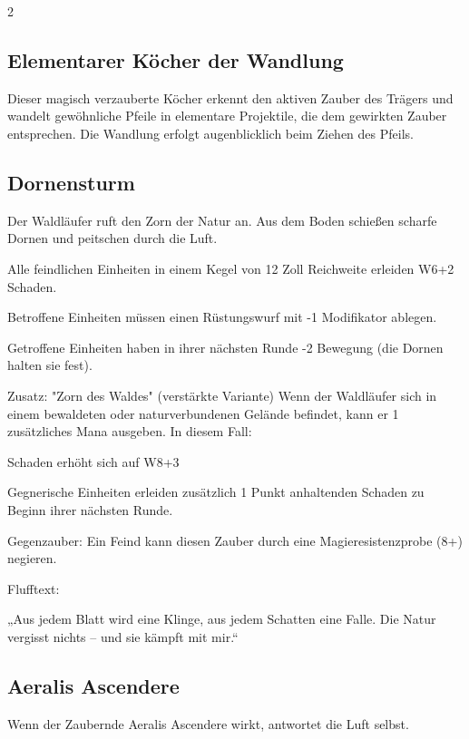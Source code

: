 \begin{multicols*}{2}
\subsection{Elementarer Köcher der Wandlung}

Dieser magisch verzauberte Köcher erkennt den aktiven Zauber des Trägers und wandelt gewöhnliche Pfeile in elementare Projektile, die dem gewirkten Zauber entsprechen. Die Wandlung erfolgt augenblicklich beim Ziehen des Pfeils.



\subsection{Dornensturm}

Der Waldläufer ruft den Zorn der Natur an. Aus dem Boden schießen scharfe Dornen und peitschen durch die Luft.

Alle feindlichen Einheiten in einem Kegel von 12 Zoll Reichweite erleiden W6+2 Schaden.

Betroffene Einheiten müssen einen Rüstungswurf mit -1 Modifikator ablegen.

Getroffene Einheiten haben in ihrer nächsten Runde -2 Bewegung (die Dornen halten sie fest).

Zusatz: "Zorn des Waldes" (verstärkte Variante) Wenn der Waldläufer sich in einem bewaldeten oder naturverbundenen Gelände befindet, kann er 1 zusätzliches Mana ausgeben. In diesem Fall:

Schaden erhöht sich auf W8+3

Gegnerische Einheiten erleiden zusätzlich 1 Punkt anhaltenden Schaden zu Beginn ihrer nächsten Runde.

Gegenzauber: Ein Feind kann diesen Zauber durch eine Magieresistenzprobe (8+) negieren.

Flufftext:

„Aus jedem Blatt wird eine Klinge, aus jedem Schatten eine Falle. Die Natur vergisst nichts – und sie kämpft mit mir.“



\subsection{Aeralis Ascendere}

Wenn der Zaubernde Aeralis Ascendere wirkt, antwortet die Luft selbst.


\end{multicols*}
